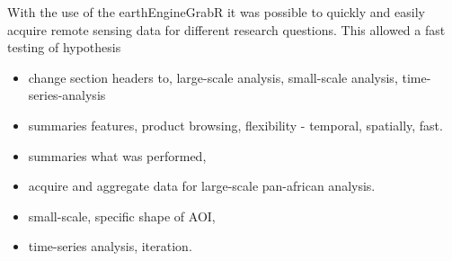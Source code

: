 With the use of the earthEngineGrabR it was possible to quickly and easily acquire remote sensing data for different research questions. This allowed a fast testing of hypothesis



\begin{itemize}
	
	\item change section headers to, large-scale analysis, small-scale analysis, time-series-analysis
	\item summaries features, product browsing, flexibility - temporal, spatially, fast.
	\item summaries what was performed, 
	\item acquire and aggregate data for large-scale pan-african analysis.
	\item small-scale, specific shape of AOI,
	\item time-series analysis, iteration.
\end{itemize}


